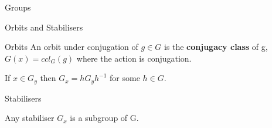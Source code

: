 \documentclass[12pt, letterpaper]{article}
\begin{document}
\begin{section}{Groups}
\begin{subsection}{Orbits and Stabilisers}
\begin{subsubsection}{Orbits}
      An orbit under conjugation of \(g \in G\) is the \textbf{conjugacy class}
      of g, \(G(x) = ccl_{G}(g)\) where the action is conjugation.

      If \(x \in G_{y}\) then \(G_{x} = hG_{y}h^{-1}\) for some \(h \in G\).

    \end{subsubsection}

    \begin{subsubsection}{Stabilisers}

      Any stabiliser \(G_{x}\) is a subgroup of G.

    \end{subsubsection}

  \end{subsection}

\end{section}
\end{document}
